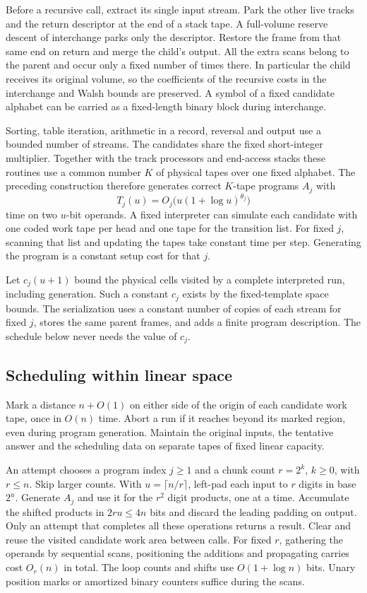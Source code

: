 Before a recursive call, extract its single input stream. Park
the other live tracks and the return descriptor at the end of a
stack tape. A full-volume reserve descent of interchange parks
only the descriptor. Restore the frame from that same end on
return and merge the child's output. All the extra scans belong
to the parent and occur only a fixed number of times there. In
particular the child receives its original volume, so the
coefficients of the recursive costs in the interchange and Walsh
bounds are preserved. A symbol of a fixed candidate alphabet can
be carried as a fixed-length binary block during interchange.

Sorting, table iteration, arithmetic in a record, reversal and
output use a bounded number of streams. The candidates share the
fixed short-integer multiplier. Together with the track processors
and end-access stacks these routines use a common number $K$ of
physical tapes over one fixed alphabet. The preceding construction
therefore generates correct $K$-tape programs $A_j$ with
\[
          T_j(u)=O_j\bigl(u(1+\log u)^{\theta_j}\bigr)
\]
time on two $u$-bit operands. A fixed interpreter can simulate
each candidate with one coded work tape per head and one tape for
the transition list. For fixed $j$, scanning that list and updating
the tapes take constant time per step. Generating the program is a
constant setup cost for that $j$.

Let $c_j(u+1)$ bound the physical cells visited by a complete
interpreted run, including generation. Such a constant $c_j$ exists
by the fixed-template space bounds. The serialization uses a
constant number of copies of each stream for fixed $j$, stores the
same parent frames, and adds a finite program description. The
schedule below never needs the value of $c_j$.

\subsection{Scheduling within linear space}

Mark a distance $n+O(1)$ on either side of the origin of each
candidate work tape, once in $O(n)$ time. Abort a run if it reaches
beyond its marked region, even during program generation. Maintain
the original inputs, the tentative answer and the scheduling data
on separate tapes of fixed linear capacity.

An attempt chooses a program index $j\ge1$ and a chunk count
$r=2^k$, $k\ge0$, with $r\le n$. Skip larger counts. With
$u=\lceil n/r\rceil$, left-pad each input to $r$ digits in
base $2^u$. Generate $A_j$ and use it for the $r^2$ digit
products, one at a time. Accumulate the shifted products in
$2ru\le4n$ bits and discard the leading padding on output.
Only an attempt that completes all these operations returns a
result. Clear and reuse the visited candidate work area between
calls. For fixed $r$, gathering the operands by sequential
scans, positioning the additions and propagating carries cost
$O_r(n)$ in total. The loop counts and shifts use $O(1+\log n)$
bits. Unary position marks or amortized binary counters suffice
during the scans.

